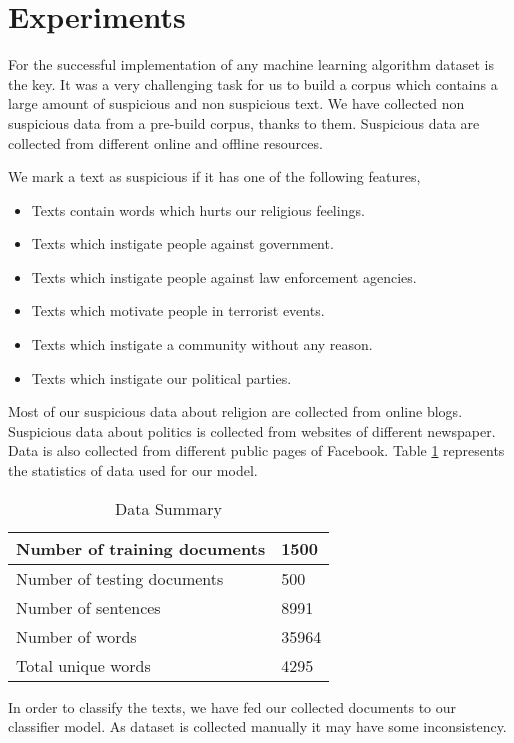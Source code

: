 \section{Experiments}
For the successful implementation of any machine learning algorithm dataset is the key. It was a very challenging task for us to build a corpus which contains a large amount of suspicious and non suspicious text. We have collected non suspicious data from a pre-build corpus\cite{banglacorpus}, thanks to them. Suspicious data are collected from different online and offline resources.%
\par \vspace{0.3cm} 
We mark a text as suspicious if it has one of the following features,
\begin{itemize}
    \item Texts contain words which hurts our religious feelings.\vspace{0.2cm} 
    \item Texts which instigate people against government.\vspace{0.2cm} 
    \item Texts which instigate people against law enforcement agencies.\vspace{0.2cm} 
    \item Texts which motivate people in terrorist events.\vspace{0.2cm} 
    \item Texts which instigate a community without any reason.\vspace{0.2cm} 
    \item Texts which instigate our political parties. 
\end{itemize}
 \par \vspace{0.3cm}
 Most of our suspicious data about religion are collected from online blogs\cite{nastikya, dhormo, istishon}. Suspicious data about politics is collected from websites of different newspaper\cite{palo, kk, juga}. Data is also collected from different public pages of Facebook\cite{bash}. Table \ref{data} represents the statistics of data used for our model.
 
 \renewcommand{\arraystretch}{1.3}
\begin{table}[h!]
\begin{center}
\caption{Data Summary}
\begin{tabular}{|m{4.8cm} | m{3cm}|}
\hline
     Number of training documents & 1500 \\
\hline
     Number of testing documents & 500 \\
\hline
     Number of sentences & 8991\\
\hline 
     Number of words & 35964\\
\hline 
     Total unique words & 4295\\
\hline
\end{tabular}
\label{data}
\end{center}
\end{table}

In order to classify the texts, we have fed our collected documents to our classifier model. As dataset is collected manually it may have some inconsistency.